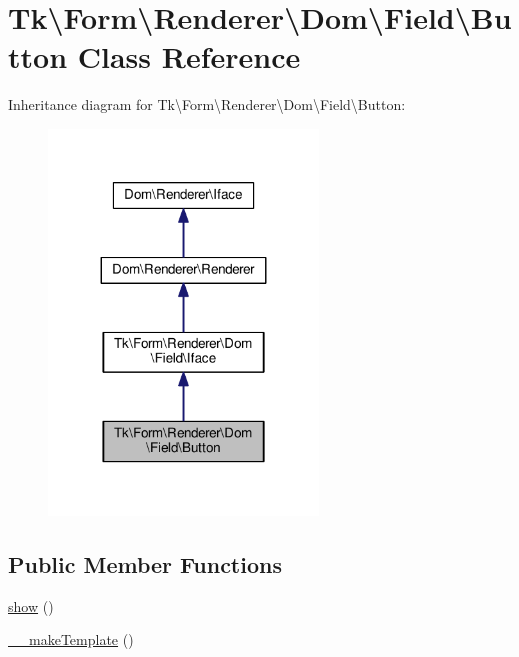 \hypertarget{classTk_1_1Form_1_1Renderer_1_1Dom_1_1Field_1_1Button}{\section{Tk\textbackslash{}Form\textbackslash{}Renderer\textbackslash{}Dom\textbackslash{}Field\textbackslash{}Button Class Reference}
\label{classTk_1_1Form_1_1Renderer_1_1Dom_1_1Field_1_1Button}
}


Inheritance diagram for Tk\textbackslash{}Form\textbackslash{}Renderer\textbackslash{}Dom\textbackslash{}Field\textbackslash{}Button\+:\nopagebreak
\begin{figure}[H]
\begin{center}
\leavevmode
\includegraphics[width=203pt]{classTk_1_1Form_1_1Renderer_1_1Dom_1_1Field_1_1Button__inherit__graph}
\end{center}
\end{figure}
\subsection*{Public Member Functions}
\begin{DoxyCompactItemize}
\item 
\hyperlink{classTk_1_1Form_1_1Renderer_1_1Dom_1_1Field_1_1Button_a7fb360221146282195b769db9ef4d814}{show} ()
\item 
\hyperlink{classTk_1_1Form_1_1Renderer_1_1Dom_1_1Field_1_1Button_ac74be1b42d02fc69baa2ea7b3ff87207}{\+\_\+\+\_\+make\+Template} ()
\end{DoxyCompactItemize}
